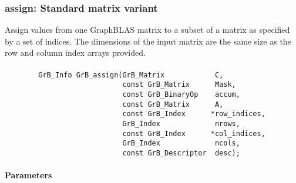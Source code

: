 



\subsubsection{{\sf assign}: Standard matrix variant}

Assign values from one GraphBLAS matrix to a subset of a 
matrix as specified by a set of indices. The dimensions of the input matrix are
the same size as the row and column index arrays provided.

\paragraph{\syntax}

\begin{verbatim}
        GrB_Info GrB_assign(GrB_Matrix            C,
                            const GrB_Matrix      Mask,
                            const GrB_BinaryOp    accum,
                            const GrB_Matrix      A,
                            const GrB_Index      *row_indices,
                            GrB_Index             nrows,
                            const GrB_Index      *col_indices,
                            GrB_Index             ncols,
                            const GrB_Descriptor  desc);
\end{verbatim}

\paragraph{Parameters}

